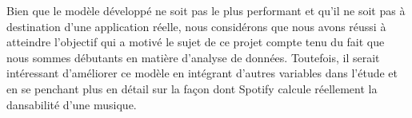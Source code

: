 \documentclass[a4paper, 12pt]{report}
\begin{document}
Bien que le modèle développé ne soit pas le plus performant et qu'il ne soit pas à destination d'une application réelle, nous considérons que nous avons réussi à atteindre l'objectif qui a motivé le sujet de ce projet compte tenu du fait que nous sommes débutants en matière d'analyse de données. Toutefois, il serait intéressant d'améliorer ce modèle en intégrant d'autres variables dans l'étude et en se penchant plus en détail sur la façon dont Spotify calcule réellement la dansabilité d'une musique.


\printbibliography[heading=bibintoc]
\end{document}

